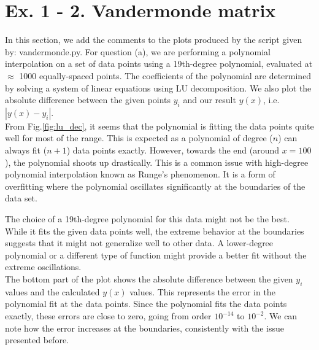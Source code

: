 \section{Ex. 1 - 2. Vandermonde matrix}
%

In this section, we add the comments to the plots produced by the script given by: vandermonde.py.
For question (a), we are performing a polynomial interpolation on a set of data points using a 19th-degree polynomial, evaluated at $\approx$ 1000 equally-spaced points. The coefficients of the polynomial are determined by solving a system of linear equations using LU decomposition. We also plot the absolute difference between the given points $y_{i}$ and our result $y(x)$, i.e. $|y(x) - y_{i}|$. \\

From Fig.\ref{fig:lu_dec}, it seems that the polynomial is fitting the data points quite well for most of the range. This is expected as a polynomial of degree ($n$) can always fit ($n+1$) data points exactly. However, towards the end (around $x=100$), the polynomial shoots up drastically. This is a common issue with high-degree polynomial interpolation known as Runge's phenomenon. It is a form of overfitting where the polynomial oscillates significantly at the boundaries of the data set.

The choice of a 19th-degree polynomial for this data might not be the best. While it fits the given data points well, the extreme behavior at the boundaries suggests that it might not generalize well to other data. A lower-degree polynomial or a different type of function might provide a better fit without the extreme oscillations. \\

The bottom part of the plot shows the absolute difference between the given $y_{i}$ values and the calculated $y(x)$ values. This represents the error in the polynomial fit at the data points. Since the polynomial fits the data points exactly, these errors are close to zero, going from order $10^{-14}$ to $10^{-2}$. We can note how the error increases at the boundaries, consistently with the issue presented before. \\

